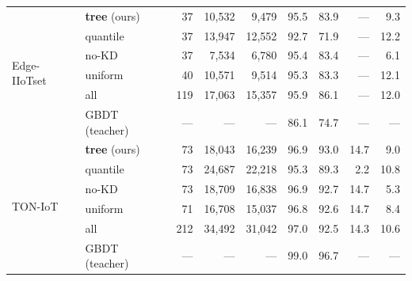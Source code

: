 \begin{table}[!ht]
{\begin{tabular}{l l r r r r r r r}
\midrule
\multirow{6}{*}{Edge-IIoTset}
& \textbf{tree} (ours) & 37 & 10,532 & 9,479 & 95.5 & 83.9 & --- & 9.3 \\
& quantile & 37 & 13,947 & 12,552 & 92.7 & 71.9 & --- & 12.2 \\
& no-KD & 37 & 7,534 & 6,780 & 95.4 & 83.4 & --- & 6.1 \\
& uniform & 40 & 10,571 & 9,514 & 95.3 & 83.3 & --- & 12.1 \\
& all & 119 & 17,063 & 15,357 & 95.9 & 86.1 & --- & 12.0 \\
& GBDT (teacher) & --- & --- & --- & 86.1 & 74.7 & --- & --- \\
\midrule
\multirow{6}{*}{TON-IoT}
& \textbf{tree} (ours) & 73 & 18,043 & 16,239 & 96.9 & 93.0 & 14.7 & 9.0 \\
& quantile & 73 & 24,687 & 22,218 & 95.3 & 89.3 & 2.2 & 10.8 \\
& no-KD & 73 & 18,709 & 16,838 & 96.9 & 92.7 & 14.7 & 5.3 \\
& uniform & 71 & 16,708 & 15,037 & 96.8 & 92.6 & 14.7 & 8.4 \\
& all & 212 & 34,492 & 31,042 & 97.0 & 92.5 & 14.3 & 10.6 \\
& GBDT (teacher) & --- & --- & --- & 99.0 & 96.7 & --- & --- \\
\bottomrule
\end{tabular}}
\end{table}

